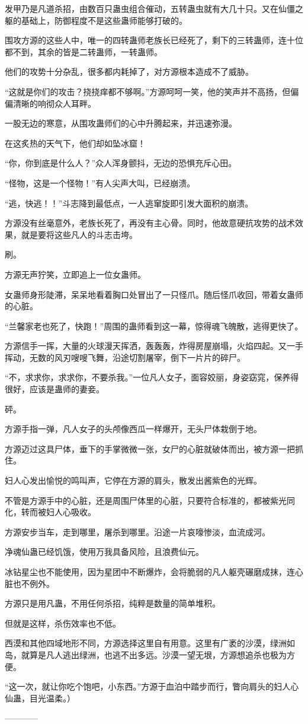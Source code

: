 \begin{this_body}
发甲乃是凡道杀招，由数百只蛊虫组合催动，五转蛊虫就有大几十只。又在仙僵之躯的基础上，防御程度不是这些蛊师能够打破的。

围攻方源的这些人中，唯一的四转蛊师老族长已经死了，剩下的三转蛊师，连十位都不到，其余的皆是二转蛊师，一转蛊师。

他们的攻势十分杂乱，很多都内耗掉了，对方源根本造成不了威胁。

“这就是你们的攻击？挠挠痒都不够啊。”方源呵呵一笑，他的笑声并不高扬，但偏偏清晰的响彻众人耳畔。

一股无边的寒意，从围攻蛊师们的心中升腾起来，并迅速弥漫。

在这炙热的天气下，他们却如坠冰窟！

“你，你到底是什么人？”众人浑身颤抖，无边的恐惧充斥心田。

“怪物，这是一个怪物！”有人尖声大叫，已经崩溃。

“逃，快逃！！”斗志降到最低点，一人逃窜旋即引发大面积的崩溃。

方源没有丝毫意外，老族长死了，再没有主心骨。同时，他故意硬抗攻势的战术效果，就是要将这些凡人的斗志击垮。

刷。

方源无声狞笑，立即追上一位女蛊师。

女蛊师身形陡滞，呆呆地看着胸口处冒出了一只怪爪。随后怪爪收回，带着女蛊师的心脏。

“兰馨家老也死了，快跑！”周围的蛊师看到这一幕，惊得魂飞魄散，逃得更快了。

方源信手一挥，大量的火球漫天挥洒，轰轰轰，炸得房屋崩塌，火焰四起。又一手挥动，无数的风刃嗖嗖飞舞，沿途切割屠宰，倒下一片片的碎尸。

“不，求求你，求求你，不要杀我。”一位凡人女子，面容姣丽，身姿窈窕，保养得很好，应该是蛊师的妻妾。

砰。

方源手指一弹，凡人女子的头颅像西瓜一样爆开，无头尸体栽倒于地。

方源迈过这具尸体，垂下的手掌微微一张，女尸的心脏就破体而出，被方源一把抓住。

妇人心发出愉悦的鸣叫声，它停在方源的肩头，散发出酱紫色的光辉。

不管是方源手中的心脏，还是周围尸体里的心脏，只要符合标准的，都被紫光同化，转而被妇人心吸收。

方源安步当车，走到哪里，屠杀到哪里。沿途一片哀嚎惨淡，血流成河。

净魂仙蛊已经饥饿，使用万我具备风险，且浪费仙元。

冰钻星尘也不能使用，因为星团中不断爆炸，会将脆弱的凡人躯壳碾磨成抹，连心脏也不例外。

方源只是用凡蛊，不用任何杀招，纯粹是数量的简单堆积。

但就是这样，杀伤效率也不低。

西漠和其他四域地形不同，方源选择这里自有用意。这里有广袤的沙漠，绿洲如岛，就算是凡人逃出绿洲，也逃不出多远。沙漠一望无垠，方源想追杀也极为方便。

“这一次，就让你吃个饱吧，小东西。”方源于血泊中踏步而行，瞥向肩头的妇人心仙蛊，目光温柔。）

------------

\end{this_body}

